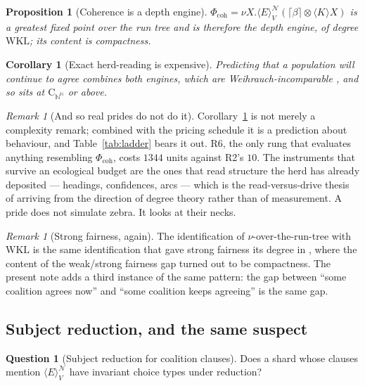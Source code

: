 \documentclass[11pt,a4paper]{article}
\theoremstyle{plain}
\newtheorem{proposition}[theorem]{Proposition}
\newtheorem{corollary}[theorem]{Corollary}
\theoremstyle{definition}
\newtheorem{question}[theorem]{Question}
\theoremstyle{remark}
\newtheorem{remark}[theorem]{Remark}
\newcommand{\gE}[2]{\langle E\rangle^{#1}_{#2}}
\newcommand{\gK}[1]{\langle K_{#1}\rangle}
\newcommand{\Nsp}{\mathcal{N}}
\newcommand{\Val}{V}
\begin{document}
\begin{proposition}[Coherence is a depth engine]\label{prop:depth}
$\Phi_{\mathrm{coh}} = \nu X.\gE{\Nsp}{\Val}(\lceil\beta\rceil \otimes
\gK{}{}X)$ is a greatest fixed point over the run tree and is therefore the
\emph{depth} engine, of degree $\mathrm{WKL}$; its content is compactness.
\end{proposition}

\begin{corollary}[Exact herd-reading is expensive]\label{cor:expensive}
Predicting that a population will \emph{continue} to agree combines both
engines, which are Weihrauch-incomparable \cite[\S5]{choicef}, and so sits at
$\mathrm{C}_{\mathbb{N}^{\mathbb{N}}}$ or above.
\end{corollary}

\begin{remark}[And so real prides do not do it]
Corollary~\ref{cor:expensive} is not merely a complexity remark; combined with
the pricing schedule it is a prediction about behaviour, and
Table~\ref{tab:ladder} bears it out. R6, the only rung that evaluates anything
resembling $\Phi_{\mathrm{coh}}$, costs $1344$ units against R2's $10$. The
instruments that survive an ecological budget are the ones that read structure
the herd has already deposited --- headings, confidences, arcs --- which is the
read-versus-drive thesis of \cite{game} arriving from the direction of degree
theory rather than of measurement. A pride does not simulate zebra. It looks at
their necks.
\end{remark}

\begin{remark}[Strong fairness, again]
The identification of $\nu$-over-the-run-tree with $\mathrm{WKL}$ is the same
identification that gave strong fairness its degree in \cite{choicef}, where the
content of the weak/strong fairness gap turned out to be compactness. The
present note adds a third instance of the same pattern: the gap between ``some
coalition agrees now'' and ``some coalition keeps agreeing'' is the same gap.
\end{remark}

\subsection{Subject reduction, and the same suspect}

\begin{question}[Subject reduction for coalition clauses]\label{q:sr}
Does a shard whose clauses mention $\gE{\Nsp}{\Val}$ have invariant choice
types under reduction?
\end{question}
\end{document}
